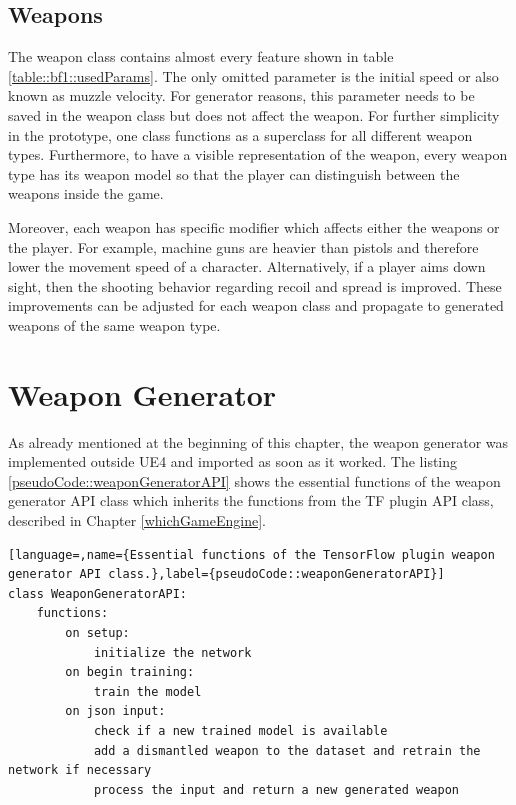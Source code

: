 \documentclass[MGS,Master,english]{twbook}%
\begin{document}
\subsection{Weapons}
The weapon class contains almost every feature shown in table \ref{table::bf1::usedParams}. The only omitted parameter is the initial speed or also known as muzzle velocity. For generator reasons, this parameter needs to be saved in the weapon class but does not affect the weapon. For further simplicity in the prototype, one class functions as a superclass for all different weapon types. Furthermore, to have a visible representation of the weapon, every weapon type has its weapon model so that the player can distinguish between the weapons inside the game. 

Moreover, each weapon has specific modifier which affects either the weapons or the player. For example, machine guns are heavier than pistols and therefore lower the movement speed of a character. Alternatively, if a player aims down sight, then the shooting behavior regarding recoil and spread is improved. These improvements can be adjusted for each weapon class and propagate to generated weapons of the same weapon type.

\section{Weapon Generator}
As already mentioned at the beginning of this chapter, the weapon generator was implemented outside UE4 and imported as soon as it worked. The listing \ref{pseudoCode::weaponGeneratorAPI} shows the essential functions of the weapon generator API class which inherits the functions from the TF plugin API class, described in Chapter \ref{whichGameEngine}. 
\begin{lstlisting}[language=,name={Essential functions of the TensorFlow plugin weapon generator API class.},label={pseudoCode::weaponGeneratorAPI}]
class WeaponGeneratorAPI:
	functions:
		on setup:
			initialize the network
		on begin training:
			train the model
		on json input:
			check if a new trained model is available
			add a dismantled weapon to the dataset and retrain the network if necessary
			process the input and return a new generated weapon
\end{lstlisting}
\end{document}
